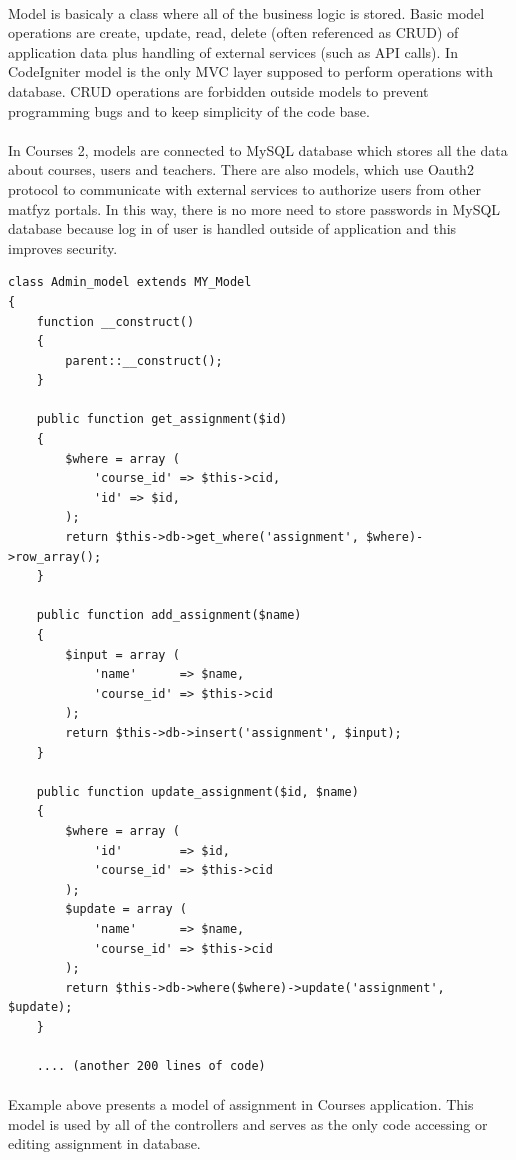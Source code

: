 \paragraph{}
Model is basicaly a class where all of the business logic is stored. Basic model operations are create, update, read, delete (often referenced as CRUD) of application data plus handling of external services (such as API calls). In CodeIgniter model is the only MVC layer supposed to perform operations with database. CRUD operations are forbidden outside models to prevent programming bugs and to keep simplicity of the code base.

\paragraph{}
In Courses 2, models are connected to MySQL database which stores all the data about courses, users and teachers. There are also models, which use Oauth2 protocol to communicate with external services to authorize users from other matfyz portals. In this way, there is no more need to store passwords in MySQL database because log in of user is handled outside of application and this improves security.

\begin{lstlisting}
class Admin_model extends MY_Model
{
    function __construct()
    {
        parent::__construct();
    }

    public function get_assignment($id)
    {
        $where = array (
            'course_id' => $this->cid,
            'id' => $id,
        );
        return $this->db->get_where('assignment', $where)->row_array();
    }

    public function add_assignment($name)
    {
        $input = array (
            'name'      => $name,
            'course_id' => $this->cid
        );
        return $this->db->insert('assignment', $input);
    }

    public function update_assignment($id, $name)
    {
        $where = array (
            'id'        => $id,
            'course_id' => $this->cid
        );
        $update = array (
            'name'      => $name,
            'course_id' => $this->cid
        );
        return $this->db->where($where)->update('assignment', $update);
    }
    
    .... (another 200 lines of code)
\end{lstlisting}

\paragraph{}
Example above presents a model of assignment in Courses application. This model is used by all of the controllers and serves as the only code accessing or editing assignment in database.


